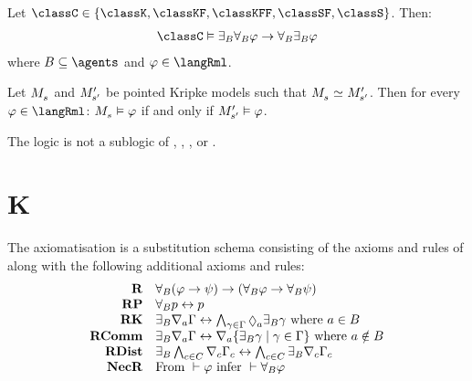 
\begin{proposition}
Let $\classC \in \{\classK, \classKF, \classKFF, \classSF, \classS\}$. Then:
$$
\begin{array}{l}
    \classC \entails \somerefsBs \allrefsBs \phi \implies \allrefsBs \somerefsBs \phi
\end{array}
$$
where $\agentsB \subseteq \agents$ and $\phi \in \langRml$.
\end{proposition}


\begin{proposition}
Let $\kPModel{\kStateS}$ and ${M^{\prime}_{{{s}^{\prime}}}}$ be pointed Kripke models such that $\kPModel{\kStateS} \bisimilar \kPModelP{\kStateSP}$.
Then for every $\phi \in \langRml$:
$\kPModel{\kStateS} \entails \phi$ if and only if ${M^{\prime}_{{{s}^{\prime}}}} \vDash \varphi$.
\end{proposition}

\begin{proposition}
The logic \logicRmlK{} is not a sublogic of \logicRmlKF{}, \logicRmlKFF{}, \logicRmlKD{}, \logicRmlSF{} or \logicRmlS{}.
\end{proposition}


\section{K}

\begin{definition}
    The axiomatisation \axiomRmlK{} is a substitution schema consisting of the axioms and rules of \axiomK{} along with the following additional axioms and rules:
$$
\begin{array}{rl}
    {\bf R} & \allrefsBs (\phi \implies \psi) \implies (\allrefsBs \phi \implies \allrefsBs \psi)\\
    {\bf RP} & \allrefsBs \atomP \iff \atomP\\
    {\bf RK} & \somerefsBs \coversA \Gamma \iff \bigwedge_{\gamma \in \Gamma} \possibleA \somerefsBs \gamma \text{ where } \agentA \in \agentsB\\
    {\bf RComm} & \somerefsBs \coversA \Gamma \iff \coversA \{\somerefsBs \gamma \mid \gamma \in \Gamma\} \text{ where } \agentA \notin \agentsB\\
    {\bf RDist} & \somerefsBs \bigwedge_{\agentC \in \agentsC} \coversC \Gamma_\agentC \iff \bigwedge_{\agentC \in \agentsC} \somerefsBs \coversC \Gamma_\agentC\\
    {\bf NecR} & \text{From } \proves \phi \text{ infer } \proves \allrefsBs \phi
\end{array}
$$
\end{definition}

